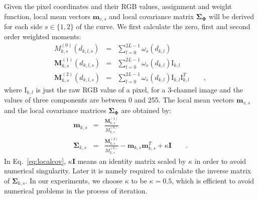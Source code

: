 \documentclass[conference]{IEEEtran}
\begin{document}
Given the pixel coordinates and their RGB values, assignment and weight
function, local mean vectors $\mathbf{m}_{v,s}$  and local covariance matrix
$\mathbf{\Sigma}_{\mathbf{\Phi}}$ will be derived for each side $s \in
\{1,2\}$ of the curve.
We first calculate the zero, first and second order weighted moments:
\begin{eqnarray}
  \label{eq:localm}
  M_{k,s}^{(0)}(d_{k,l,s}) &=& \sum_{l=0}^{2L-1} \omega_s(d_{k,l})\\
  \mathbf{M}_{k,s}^{(1)}(d_{k,l,s}) &=& \sum_{l=0}^{2L-1} \omega_s(d_{k,l}) \mathrm{I}_{k,l}\\
  \mathbf{M}_{k,s}^{(2)}(d_{k,l,s}) &=& \sum_{l=0}^{2L-1} \omega_s(d_{k,l}) \mathrm{I}_{k,l}\mathrm{I}_{k,l}^T\qquad,
\end{eqnarray}
where $\mathrm{I}_{k,l}$ is just the raw RGB value of a pixel, for a
3-channel image and the values of three components
are  between 0 and 255. The local mean vectors $\mathbf{m}_{v,s}$  and
the local covariance matrices
$\mathbf{\Sigma}_{\mathbf{\Phi}}$  are obtained by:
\begin{eqnarray}
  \label{eq:localmean}
  \mathbf{m}_{k,s} &=& \frac{\mathbf{M}^{(1)}_{k,s}}{M^{(0)}_{k,s}}\\
  \label{eq:localcov}
  \mathbf{\Sigma}_{k,s} &=& \frac{\mathbf{M}^{(2)}_{k,s}}{M^{(0)}_{k,s}}
  - \mathbf{m}_{k,s}\mathbf{m}_{k,s}^T  + \kappa \mathbf{I}\qquad.
\end{eqnarray}
In Eq.~\ref{eq:localcov}, $\kappa \mathbf{I}$  means an identity matrix scaled by
$\kappa$ in order to avoid numerical singularity. Later it is namely
required to calculate the inverse matrix of
$\mathbf{\Sigma}_{k,s}$. In our experiments, we choose $\kappa$ to be
$\kappa = 0.5$, which is efficient to avoid numerical problems in the
process of iteration.
\end{document}
